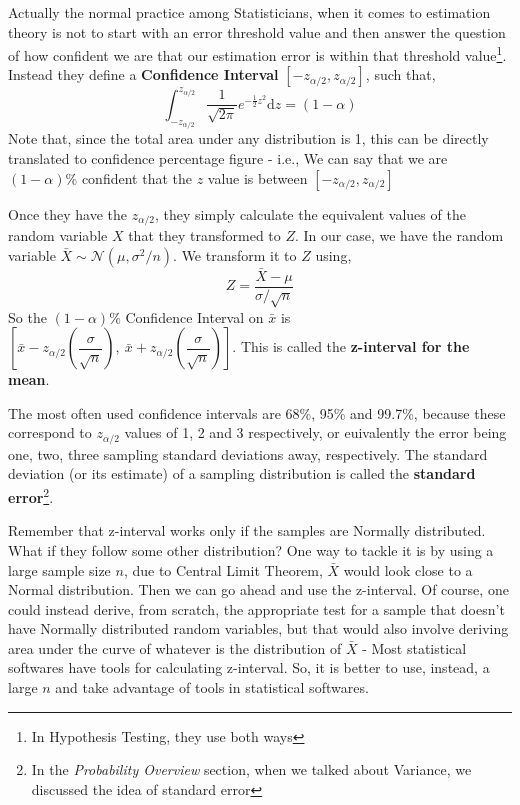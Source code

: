 Actually the normal practice among Statisticians, when it comes to estimation theory is not to start with an error threshold value and then answer the question of how confident we are that our estimation error is within that threshold value\footnote{In Hypothesis Testing, they use both ways}. Instead they define a \textbf{Confidence Interval}  \( [-z_{\alpha/2}, z_{\alpha/2}] \), such that,
	\[ \int_{-z_{\alpha/2}}^{z_{\alpha/2}}  \frac{1}{\sqrt{2\pi}} e^{-\frac{1}{2}z^2} \mathrm{d}z  = (1-\alpha)\]
Note that, since the total area under any distribution is 1, this can be directly translated to confidence percentage figure - i.e., We can say that we are \( (1-\alpha)\% \) confident that the $z$ value is between  \( [-z_{\alpha/2}, z_{\alpha/2}] \)

Once they have the \( z_{\alpha/2} \), they simply calculate the equivalent values of the random variable $X$ that they transformed to $Z$. In our case, we have the random variable \( \bar{X} \sim \mathcal{N}(\mu,\sigma^2/n) \). We transform it to $Z$ using,
 	\[  Z = \frac{\bar{X}-\mu}{\sigma/\sqrt{n}} \]
 So the \( (1-\alpha)\% \) Confidence Interval on $\bar{x}$ is \( [ \bar{x} - z_{\alpha/2}\left(\dfrac{\sigma}{\sqrt{n}}\right),\ \bar{x} + z_{\alpha/2}\left(\dfrac{\sigma}{\sqrt{n}}\right) ] \). This is called the \textbf{z-interval for the mean}.
 
The most often used confidence intervals are 68\%, 95\% and 99.7\%, because these correspond to $z_{\alpha/2}$ values of 1, 2 and 3 respectively, or euivalently the error being one, two, three sampling standard deviations away, respectively. The standard deviation (or its estimate) of a sampling distribution is called the \textbf{standard error}\footnote{In the \emph{Probability Overview} section, when we talked about Variance, we discussed the idea of standard error}. 

Remember that z-interval works only if the samples are Normally distributed. What if they follow some other distribution? One way to tackle it is by using a large sample size $n$, due to Central Limit Theorem, $\bar{X}$ would look close to a Normal distribution. Then we can go ahead and use the z-interval. Of course, one could instead derive, from scratch, the appropriate test for a sample that doesn't have Normally distributed random variables, but that would also involve deriving area under the curve of whatever is the distribution of $\bar{X}$ - Most statistical softwares have tools for calculating z-interval. So, it is better to use, instead, a large $n$ and take advantage of tools in statistical softwares.
 
